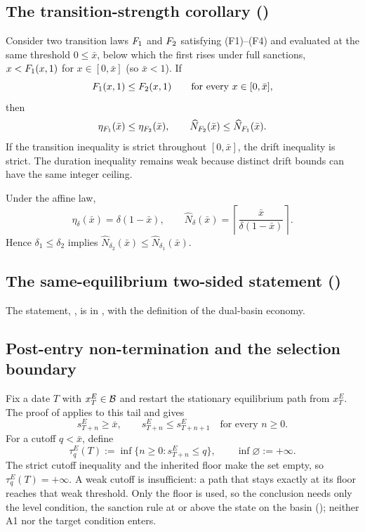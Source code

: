 \subsection{The transition-strength corollary ()}

\begin{corollary}
\label{cor:shock-transition-strength}
Consider two transition laws $F_1$ and $F_2$ satisfying
\textup{(F1)--(F4)} and evaluated at the same threshold $0\le\bar x$, below
which the first rises under full sanctions, $x<F_1(x,1)$ for
$x\in[0,\bar x]$ (so $\bar x<1$). If
\[
F_1(x,1)\le F_2(x,1)
\qquad\text{for every }x\in[0,\bar x],
\]
then
\[
\eta_{F_1}(\bar x)\le\eta_{F_2}(\bar x),
\qquad
\widehat N_{F_2}(\bar x)
\le\widehat N_{F_1}(\bar x).
\]
If the transition inequality is strict throughout $[0,\bar x]$, the
drift inequality is strict. The duration inequality remains weak
because distinct drift bounds can have the same integer ceiling.

Under the affine law,
\[
\eta_\delta(\bar x)=\delta(1-\bar x),
\qquad
\widehat N_\delta(\bar x)
=\left\lceil
\frac{\bar x}{\delta(1-\bar x)}
\right\rceil.
\]
Hence $\delta_1\le\delta_2$ implies
$\widehat N_{\delta_2}(\bar x)\le
\widehat N_{\delta_1}(\bar x)$.
\end{corollary}

\subsection{The same-equilibrium two-sided statement ()}

The statement, , is in
, with the definition of the dual-basin economy.

\subsection{Post-entry non-termination and the selection boundary}
\label{app:nontermination}

Fix a date $T$ with $x_T^E\in\mathcal{B}$ and restart the stationary
equilibrium path from $x_T^E$. The proof of
 applies to this tail and gives
\[
s_{T+n}^E\ge\bar x,
\qquad
s_{T+n}^E\le s_{T+n+1}^E
\quad\text{for every }n\ge0.
\]
For a cutoff $q<\bar x$, define
\[
\tau_q^E(T)
:=\inf\{n\ge0:s_{T+n}^E\le q\},
\qquad \inf\varnothing:=+\infty.
\]
The strict cutoff inequality and the inherited floor make the set
empty, so $\tau_q^E(T)=+\infty$. A weak cutoff is insufficient: a path
that stays exactly at its floor reaches that weak threshold. Only the floor is
used, so the conclusion needs only the level condition, the sanction rule at or
above the state on the basin ();
neither A1 nor the target condition enters.


